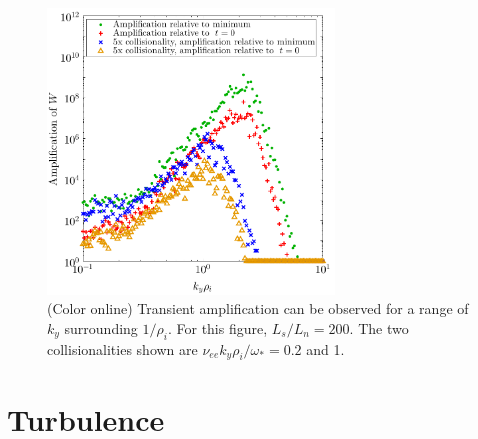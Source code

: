 \documentclass[12pt,superscriptaddress]{revtex4}
\newcommand{\nuee}{\nu_{ee}}
\begin{document}
\begin{figure}[h!]
\includegraphics[width=3in]{m20141122_01_plotTransientAmplificationKyScans.pdf}
\caption{(Color online) Transient amplification can be observed
for a range of $k_y$ surrounding $1/\rho_i$.  For this figure, $L_s/L_n=200$.
The two collisionalities shown are $\nuee k_y \rho_i/\omega_* = 0.2$ and 1.
\label{fig:transientAmplificationVsKy}}
\end{figure}



\section{Turbulence}
\label{sec:turbulence}
\end{document}

